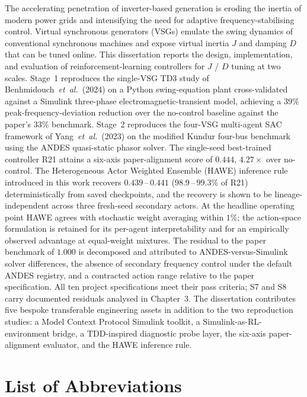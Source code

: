 \documentclass{unnc-fyp}
\begin{document}
The accelerating penetration of inverter-based generation is
eroding the inertia of modern power grids and intensifying the
need for adaptive frequency-stabilising control.
Virtual synchronous generators (VSGs) emulate the swing dynamics
of conventional synchronous machines and expose virtual inertia
$J$ and damping $D$ that can be tuned online.
This dissertation reports the design, implementation, and
evaluation of reinforcement-learning controllers for $J$ / $D$
tuning at two scales.
Stage~1 reproduces the single-VSG TD3 study of
Benhmidouch~\emph{et~al.}~(2024) on a Python swing-equation plant
cross-validated against a Simulink three-phase
electromagnetic-transient model, achieving a $39\%$
peak-frequency-deviation reduction over the no-control baseline
against the paper's $33\%$ benchmark.
Stage~2 reproduces the four-VSG multi-agent SAC framework of
Yang~\emph{et~al.}~(2023) on the modified Kundur four-bus
benchmark using the ANDES quasi-static phasor solver.
The single-seed best-trained controller R21 attains a six-axis
paper-alignment score of $0.444$, $4.27\times$ over no-control.
The Heterogeneous Actor Weighted Ensemble (HAWE) inference rule
introduced in this work recovers $0.439$\,--\,$0.441$
($98.9$\,--\,$99.3\%$ of R21) deterministically from saved
checkpoints, and the recovery is shown to be lineage-independent
across three fresh-seed secondary actors.
At the headline operating point HAWE agrees with stochastic
weight averaging within $1\%$; the action-space formulation is
retained for its per-agent interpretability and for an
empirically observed advantage at equal-weight mixtures.
The residual to the paper benchmark of $1.000$ is decomposed and
attributed to ANDES-versus-Simulink solver differences, the
absence of secondary frequency control under the default ANDES
registry, and a contracted action range relative to the paper
specification.
All ten project specifications meet their pass criteria; S7 and
S8 carry documented residuals analysed in Chapter~3.
The dissertation contributes five bespoke transferable
engineering assets in addition to the two reproduction studies:
a Model Context Protocol Simulink toolkit, a
Simulink-as-RL-environment bridge, a TDD-inspired diagnostic
probe layer, the six-axis paper-alignment evaluator, and the
HAWE inference rule.

\clearpage
\tableofcontents
\clearpage

\listoffigures
\clearpage

\listoftables
\clearpage

\chapter*{List of Abbreviations}
\end{document}
